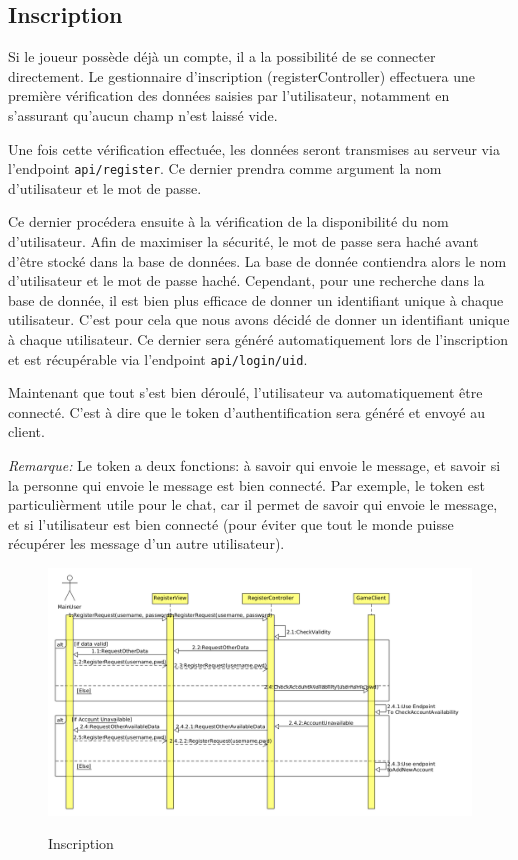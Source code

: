 \documentclass[../design_fonctionnement_sys.tex]{subfiles}
\begin{document}
\subsection{Inscription}
Si le joueur possède déjà un compte, il a la possibilité de se connecter directement.
Le gestionnaire d'inscription (registerController) effectuera une première vérification des données saisies par l'utilisateur, 
notamment en s'assurant qu'aucun champ n'est laissé vide.

Une fois cette vérification effectuée, les données seront transmises au serveur via l'endpoint \texttt{api/register}. Ce dernier prendra comme argument la nom d'utilisateur et le mot de passe.

Ce dernier procédera ensuite à la vérification de la disponibilité du nom d'utilisateur. Afin de maximiser la sécurité, le mot de passe sera haché avant d'être stocké dans la base de données.
La base de donnée contiendra alors le nom d'utilisateur et le mot de passe haché. Cependant, pour une recherche dans la base de donnée, 
il est  bien plus efficace de donner un identifiant unique à chaque utilisateur. C'est pour cela que nous avons décidé de donner un identifiant unique à chaque utilisateur.
Ce dernier sera généré automatiquement lors de l'inscription et est récupérable via l'endpoint \texttt{api/login/uid}.

Maintenant que tout s'est bien déroulé, l'utilisateur va automatiquement être connecté. C'est à dire que le token d'authentification sera généré et envoyé au client.

\textit{Remarque:} Le token a deux fonctions: à savoir qui envoie le message, et savoir si la personne qui envoie le message est bien connecté.
Par exemple, le token est particulièrment utile pour le chat, car il permet de savoir qui envoie le message, et si l'utilisateur est bien connecté (pour éviter que tout le monde puisse récupérer les message d'un autre utilisateur).

\begin{figure}[H]
    \centering
    \includegraphics[scale=0.4]{img_design/inscription_fonctionnement.png}
    \label{fig:seq_match_client}
    \caption{Inscription}
\end{figure}
\newpage
\end{document}
